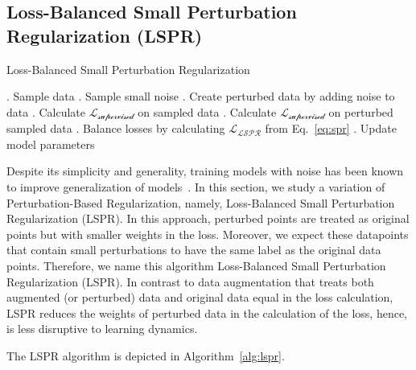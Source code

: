   
\subsection{Loss-Balanced Small Perturbation Regularization (LSPR)}
\begin{algorithm}
\caption{Loss-Balanced Small Perturbation Regularization}
\label{alg:lspr}
\begin{algorithmic}
    . Sample data
    . Sample small noise
    . Create perturbed data by adding noise to data
    . Calculate $\mathcal{L_{\text{supervised}}}$ on sampled data
    . Calculate $\mathcal{L_{\text{supervised}}}$ on perturbed sampled data
    . Balance losses by calculating $\mathcal{L_{\text{LSPR}}}$ from Eq.~\ref{eq:spr}
    . Update model parameters
\EndFor

\end{algorithmic}
\end{algorithm}
Despite its simplicity and generality, training models with noise has been known to improve  generalization of models~\cite{bishop1995training}.
In this section, we study a variation of Perturbation-Based Regularization, namely, Loss-Balanced Small Perturbation Regularization (LSPR). 
In this approach, perturbed points are treated as original points but with smaller weights in the loss.
Moreover, we expect these datapoints that contain small perturbations to have the same label as the original data points. Therefore, we name this algorithm Loss-Balanced Small Perturbation Regularization (LSPR).
In contrast to data augmentation that treats both augmented (or perturbed) data and original data equal in the loss calculation, LSPR reduces the weights of perturbed data in the calculation of the loss, hence, is less disruptive to learning dynamics.


The LSPR algorithm is depicted in Algorithm~\ref{alg:lspr}. 

